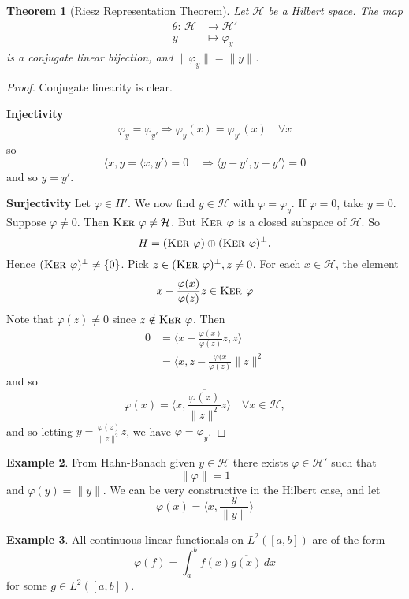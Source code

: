 \documentclass[10pt, oneside, reqno]{amsart}
\theoremstyle{plain}%
\newtheorem{thm}{Theorem}[section]
\theoremstyle{definition}
\newtheorem{exmp}[thm]{Example}
\theoremstyle{remark}
\newcommand{\Hil}{\mathcal{H}}
\newcommand{\mapping}[5]{\begin{align*}
    #1 : \,     #2 &\rightarrow #3 \\
            #4  &\mapsto #5
\end{align*}    
}
\renewcommand{\phi}{\varphi}
\renewcommand{\ker}{\textsc{Ker\ }}
\begin{document}
\begin{thm}[Riesz Representation Theorem]
    Let $\Hil$ be a Hilbert space. The map \mapping{\theta}{\Hil}{\Hil'}{y}{\phi_y} is a conjugate linear bijection, and $\| \phi_y \| = \| y \|$.  
\end{thm}
\begin{proof}
    Conjugate linearity is clear.
    
    \textbf{Injectivity} 
    \begin{align*}
        \phi_y = \phi_{y'} \Rightarrow \phi_y(x) = \phi_{y'}(x) \quad \forall x
    \end{align*} so \[
        \langle x, y = \langle x, y' \rangle  = 0 \quad \Rightarrow \langle y - y', y - y' \rangle = 0
    \] and so $y = y'$.
    
    \textbf{Surjectivity}
    Let $\phi \in H'$.  We now find $y \in \Hil$ with $\phi = \phi_y$.  If $\phi = 0$, take $y = 0$.  Suppose $\phi \neq 0$.  Then $\ker \phi \neq \Hil$.  But $\ker \phi$ is a closed subspace of $\Hil$.  So \[
        H = (\ker \phi) \oplus (\ker \phi)^\perp.
    \] Hence $(\ker \phi)^\perp \neq \{ 0 \}$. Pick $z \in (\ker \phi)^\perp, z \neq 0$.  For each $x \in \Hil$, the element \[
        x - \frac{\phi(x)}{\phi(z)} z \in \ker \phi
    \] Note that $\phi(z) \neq 0$ since $z \notin \ker \phi$.  Then \begin{align*}
        0   &=  \langle x - \frac{\phi(x)}{\phi(z)}z, z \rangle \\
            &= \langle x, z - \frac{\phi(x}{\phi(z)} \| z \|^2
    \end{align*}
    and so \[
    \phi(x) = \langle x, \frac{\overline{\phi(z)}}{\| z \|^2} z \rangle \quad \forall x \in \Hil,\]
    and so letting $y = \frac{\overline{\phi(z)}}{\| z \|^2} z$, we have $\phi = \phi_y$.  
\end{proof}

\begin{exmp}
    From Hahn-Banach given $y \in \Hil$ there exists $\phi \in \Hil'$ such that \[
        \| \phi \| = 1
    \] and $\phi(y) = \| y \|$. We can be very constructive in the Hilbert case, and let \[
        \phi(x) = \langle x, \frac{y}{\| y \|} \rangle
    \] 
\end{exmp}
\begin{exmp}
    All continuous linear functionals on $L^2([a,b])$ are of the form \[
        \phi(f) = \int_a^b f(x) \overline{g(x)} \, dx 
    \] for some $g \in L^2([a,b])$.
\end{exmp}
\end{document}
